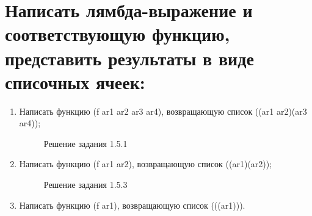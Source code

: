 \documentclass[12pt]{report}
\begin{document}
\section{Написать лямбда-выражение и соответствующую функцию, представить результаты в виде списочных ячеек:}

\begin{enumerate}
	\item Написать функцию (f ar1 ar2 ar3 ar4), возвращающую список ((ar1 ar2)(ar3 ar4));
	\begin{figure}[!h]
		\caption{Решение задания 1.5.1}
	\end{figure}
	\item Написать функцию (f ar1 ar2), возвращающую список ((ar1)(ar2));
	\begin{figure}[!h]
		\caption{Решение задания 1.5.3}
	\end{figure}
	\clearpage
	\item Написать функцию (f ar1), возвращающую список (((ar1))).
	\begin{figure}[!h]

\end{figure}
\end{enumerate}
\end{document}
